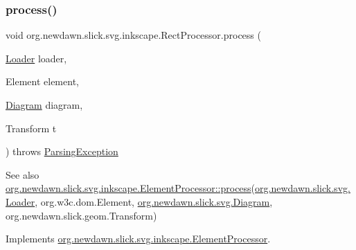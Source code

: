 \subsubsection{\texorpdfstring{process()}{process()}}
{\footnotesize\ttfamily void org.\+newdawn.\+slick.\+svg.\+inkscape.\+Rect\+Processor.\+process (\begin{DoxyParamCaption}\item[{\mbox{\hyperlink{interfaceorg_1_1newdawn_1_1slick_1_1svg_1_1_loader}{Loader}}}]{loader,  }\item[{Element}]{element,  }\item[{\mbox{\hyperlink{classorg_1_1newdawn_1_1slick_1_1svg_1_1_diagram}{Diagram}}}]{diagram,  }\item[{Transform}]{t }\end{DoxyParamCaption}) throws \mbox{\hyperlink{classorg_1_1newdawn_1_1slick_1_1svg_1_1_parsing_exception}{Parsing\+Exception}}\hspace{0.3cm}{\ttfamily [inline]}}

\begin{DoxySeeAlso}{See also}
\mbox{\hyperlink{interfaceorg_1_1newdawn_1_1slick_1_1svg_1_1inkscape_1_1_element_processor_acd170a9e1119481edae885780db59a2e}{org.\+newdawn.\+slick.\+svg.\+inkscape.\+Element\+Processor\+::process}}(\mbox{\hyperlink{interfaceorg_1_1newdawn_1_1slick_1_1svg_1_1_loader}{org.\+newdawn.\+slick.\+svg.\+Loader}}, org.\+w3c.\+dom.\+Element, \mbox{\hyperlink{classorg_1_1newdawn_1_1slick_1_1svg_1_1_diagram}{org.\+newdawn.\+slick.\+svg.\+Diagram}}, org.\+newdawn.\+slick.\+geom.\+Transform) 
\end{DoxySeeAlso}


Implements \mbox{\hyperlink{interfaceorg_1_1newdawn_1_1slick_1_1svg_1_1inkscape_1_1_element_processor_acd170a9e1119481edae885780db59a2e}{org.\+newdawn.\+slick.\+svg.\+inkscape.\+Element\+Processor}}.


